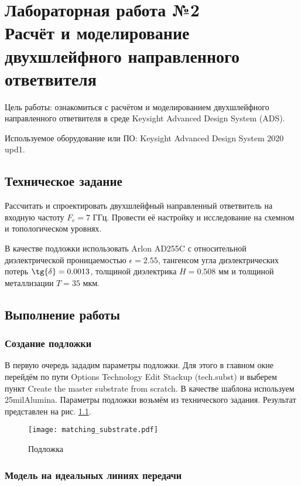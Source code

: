 \chapter{Лабораторная работа №2 \\
Расчёт и моделирование двухшлейфного направленного ответвителя}

Цель работы: ознакомиться с расчётом и моделированием двухшлейфного направленного ответвителя в среде Keysight Advanced Design System (ADS).

Используемое оборудование или ПО: Keysight Advanced Design System 2020 upd1.

\section{Техническое задание}

Рассчитать и спроектировать двухшлейфный направленный ответвитель на входную частоту $F_c = 7 \text{~ГГц}$.
Провести её настройку и исследование на схемном и топологическом уровнях.

В качестве подложки использовать Arlon AD255C с относительной диэлектрической проницаемостью $\epsilon = 2.55$, тангенсом угла диэлектрических потерь $\tg{\delta} = 0.0013$, толщиной диэлектрика $H = 0.508 \text{~мм}$ и толщиной металлизации $T = 35 \text{~мкм}$.

\section{Выполнение работы}

\subsection{Создание подложки}

В первую очередь зададим параметры подложки. Для этого в главном окне перейдём по пути Options \textrightarrow Technology \textrightarrow Edit Stackup (tech.subst) и выберем пункт Create the master substrate from scratch. В качестве шаблона используем 25milAlumina. Параметры подложки возьмём из технического задания. Результат представлен на рис. \ref{fig:matching_substrate}.

\begin{figure}
    \centering
    \texttt{[image: matching\_substrate.pdf]}
    \caption{Подложка}
    \label{fig:matching_substrate}
\end{figure}

\subsection{Модель на идеальных линиях передачи}

